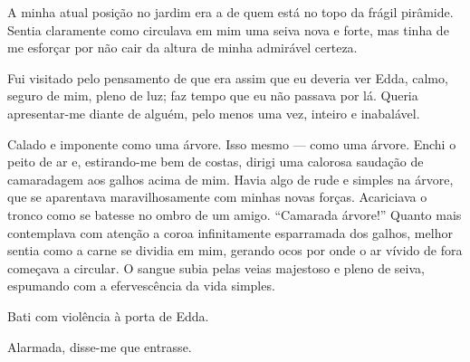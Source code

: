 A minha atual posição no jardim era a de quem está no topo da frágil pirâmide.
Sentia claramente como circulava em mim uma seiva nova e forte, mas tinha de
me esforçar por não cair da altura de minha admirável certeza.

Fui visitado pelo pensamento de que era assim que eu deveria ver Edda, calmo,
seguro de mim, pleno de luz; faz tempo que eu não passava por lá. Queria
apresentar-me diante de alguém, pelo menos uma vez, inteiro e inabalável.

Calado e imponente como uma árvore. Isso mesmo --- como uma árvore. Enchi o
peito de ar e, estirando-me bem de costas, dirigi uma calorosa saudação de
camaradagem aos galhos acima de mim. Havia algo de rude e simples na árvore,
que se aparentava maravilhosamente com minhas novas forças. Acariciava o
tronco como se batesse no ombro de um amigo. ``Camarada árvore!'' Quanto mais
contemplava com atenção a coroa infinitamente esparramada dos galhos, melhor
sentia como a carne se dividia em mim, gerando ocos por onde o ar vívido de
fora começava a circular. O sangue subia pelas veias majestoso e pleno de
seiva, espumando com a efervescência da vida simples.





Bati com violência à porta de Edda.

Alarmada, disse-me que entrasse.

